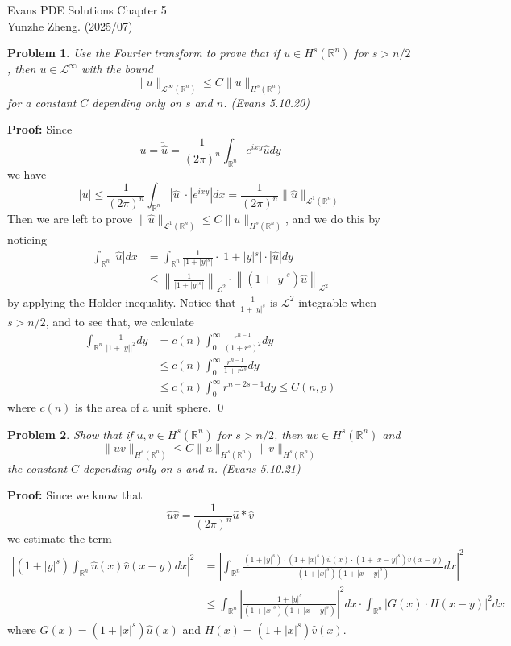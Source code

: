 \documentclass[12pt]{article}
\newtheorem{problem}{Problem}
\begin{document}
\noindent Evans PDE Solutions \hfill Chapter 5\\
Yunzhe Zheng. (2025/07)

\hrulefill

\begin{problem}
Use the Fourier transform to prove that if $u\in H^s(\mathbb{R}^n)$ for $s>n/2$, then $u\in\mathscr{L}^\infty$ with the bound 
$$
\|u\|_{\mathscr{L}^\infty(\mathbb{R}^n)}\leq C\|u\|_{H^s(\mathbb{R}^n)}
$$
for a constant $C$ depending only on $s$ and $n$. (Evans 5.10.20)
\end{problem}

\textbf{Proof:} Since 
$$
u=\check{\hat{u}}=\frac{1}{(2\pi)^n}\int_{\mathbb{R}^n}e^{ixy}\hat{u}dy
$$
we have 
$$
|u|\leq \frac{1}{(2\pi)^n}\int_{\mathbb{R}^n}|\hat{u}|\cdot|e^{ixy}|dx=\frac{1}{(2\pi)^n}\|\hat{u}\|_{\mathscr{L}^1(\mathbb{R}^n)}
$$
Then we are left to prove $\|\hat{u}\|_{\mathscr{L}^1(\mathbb{R}^n)}\leq C\|u\|_{H^s(\mathbb{R}^n)}$, and we do this by noticing
\begin{align*}
    \int_{\mathbb{R}^n}|\hat{u}|dx&=\int_{\mathbb{R}^n}\frac{1}{|1+|y|^s|}\cdot|1+|y|^s|\cdot|\hat{u}|dy \\
    &\leq \left\|\frac{1}{|1+|y|^s|}\right\|_{\mathscr{L}^2}\cdot\left\|(1+|y|^s)\hat{u}\right\|_{\mathscr{L}^2}
\end{align*}
by applying the Holder inequality. Notice that $\frac{1}{1+|y|^s}$ is $\mathscr{L}^2$-integrable when $s>n/2$, and to see that, we calculate
\begin{align*}
    \int_{\mathbb{R}^n}\frac{1}{|1+|y||^2}dy&=c(n)\int_0^\infty\frac{r^{n-1}}{(1+r^s)^2}dy \\
    &\leq c(n)\int_{0}^{\infty}\frac{r^{n-1}}{1+r^{2s}}dy \\
    &\leq c(n)\int_0^\infty r^{n-2s-1}dy \leq C(n, p)
\end{align*}
where $c(n)$ is the area of a unit sphere. \qed
\\
\begin{problem}
Show that if $u, v\in H^s(\mathbb{R}^n)$ for $s>n/2$, then $uv\in H^s(\mathbb{R}^n)$ and 
$$
\|uv\|_{H^s(\mathbb{R}^n)}\leq C\|u\|_{H^s(\mathbb{R}^n)}\|v\|_{H^s(\mathbb{R}^n)}
$$
the constant $C$ depending only on $s$ and $n$. (Evans 5.10.21)
\end{problem}

\textbf{Proof:} Since we know that 
$$
\widehat{uv}=\frac{1}{(2\pi)^n}\hat{u}*\hat{v}
$$
we estimate the term
\begin{align*}
    \left|(1+|y|^s)\int_{\mathbb{R}^n}\hat{u}(x)\hat{v}(x-y)dx\right|^2&=\left|\int_{\mathbb{R}^n}\frac{(1+|y|^s)\cdot(1+|x|^s)\hat{u}(x)\cdot(1+|x-y|^s)\hat{v}(x-y)}{(1+|x|^s)(1+|x-y|^s)}dx\right|^2 \\
    &\leq \int_{\mathbb{R}^n}\left|\frac{1+|y|^s}{(1+|x|^s)(1+|x-y|^s)}\right|^2dx\cdot\int_{\mathbb{R}^n}\left|G(x)\cdot H(x-y)\right|^2dx
\end{align*}
where $G(x)=(1+|x|^s)\hat{u}(x)$ and $H(x)=(1+|x|^s)\hat{v}(x)$.
\end{document}
